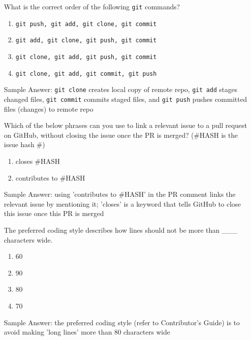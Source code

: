 \documentclass[12pt,fleqn]{examtst}
\begin{document}

\noindent
\begin{minipage}{\textwidth}

What is the correct order of the following \lstinline{git} commands?

\begin{enumerate}
    \item \lstinline{git push, git add, git clone, git commit}
    \item \lstinline{git add, git clone, git push, git commit}
    \item \lstinline{git clone, git add, git push, git commit}
    \item \lstinline{git clone, git add, git commit, git push} \marker
\end{enumerate}
Sample Answer: \lstinline{git clone} creates local copy of remote repo, \lstinline{git add} stages changed files, \lstinline{git commit} commits staged files, and \lstinline{git push} pushes committed files (changes) to remote repo

Which of the below phrases can you use to link a relevant issue to a pull request on GitHub, without closing the issue once the PR is merged? (\#HASH is the issue hash \#)

\begin{enumerate}
    \item closes \#HASH
    \item contributes to \#HASH \marker
\end{enumerate}
Sample Answer: using 'contributes to \#HASH' in the PR comment links the relevant issue by mentioning it; 'closes' is a keyword that tells GitHub to close this issue once this PR is merged

The preferred coding style describes how lines should not be more than \_\_\_ characters wide.

\begin{enumerate}
    \item 60
    \item 90
    \item 80 \marker
    \item 70
\end{enumerate}
Sample Answer: the preferred coding style (refer to Contributor's Guide) is to avoid making 'long lines' more than 80 characters wide

\end{minipage}
\end{document}
